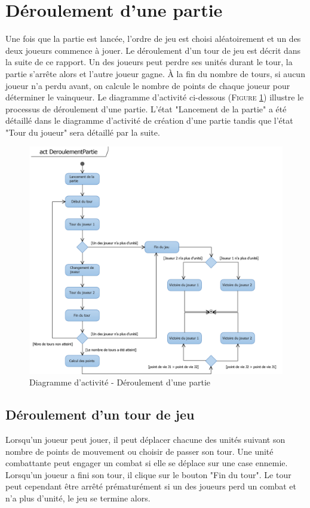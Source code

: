 \documentclass[a4paper,11pt]{article}
\begin{document}
\section{Déroulement d'une partie}
	\vspace*{0.5cm}
	Une fois que la partie est lancée, l'ordre de jeu est choisi aléatoirement et un des deux joueurs commence à jouer. Le déroulement d'un tour de jeu est décrit dans la suite de ce rapport. Un des joueurs peut perdre ses unités durant le tour, la partie s'arrête alors et l'autre joueur gagne. À la fin du nombre de tours, si aucun joueur n'a perdu avant, on calcule le nombre de points de chaque joueur pour déterminer le vainqueur. Le diagramme d'activité ci-dessous (\textsc{Figure \ref{fig:actpartie}}) illustre le processus de déroulement d'une partie. L'état "Lancement de la partie" a été détaillé dans le diagramme d'activité de création d'une partie tandis que l'état "Tour du joueur" sera détaillé par la suite.

	\vspace*{1cm}
	\begin{figure}[ht!]
		\includegraphics{Diagrammes/Deroulement/actDeroulementPartie.png}
		\caption{Diagramme d'activité - Déroulement d'une partie}
		\label{fig:actpartie}
	\end{figure}
	\vspace*{1cm}
	\newpage

	\subsection{Déroulement d'un tour de jeu}
		\vspace*{0.5cm}
		Lorsqu'un joueur peut jouer, il peut déplacer chacune des unités suivant son nombre de points de mouvement ou choisir de passer son tour. Une unité combattante peut engager un combat si elle se déplace sur une case ennemie. Lorsqu'un joueur a fini son tour, il clique sur le bouton "Fin du tour". Le tour peut cependant être arrêté prématurément si un des joueurs perd un combat et n'a plus d'unité, le jeu se termine alors.
		\vspace*{0.5cm}
\end{document}

